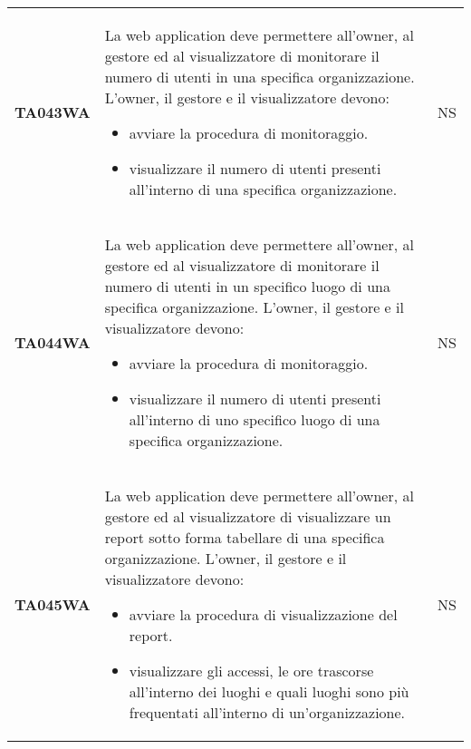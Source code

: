\documentclass[../piano-di-qualifica.tex]{subfiles}
\begin{document}
\begin{longtable}[H]{>{\centering\bfseries}m{3cm} >{}m{10cm} >{\centering\arraybackslash}m{3cm}}
  TA043WA           & La web application deve permettere all'owner, al gestore ed al visualizzatore di monitorare il numero di utenti in una specifica organizzazione. \newline
  L'owner, il gestore e il visualizzatore devono:
  \begin{itemize}
    \item avviare la procedura di monitoraggio.
    \item visualizzare il numero di utenti presenti all'interno di una specifica organizzazione.
  \end{itemize}
                    & NS                                                                                                                                                                                                                                                               \\
  TA044WA           & La web application deve permettere all'owner, al gestore ed al visualizzatore di monitorare il numero di utenti in un specifico luogo di una specifica organizzazione. \newline
  L'owner, il gestore e il visualizzatore devono:
  \begin{itemize}
    \item avviare la procedura di monitoraggio.
    \item visualizzare il numero di utenti presenti all'interno di uno specifico luogo di una specifica organizzazione.
  \end{itemize}
                    & NS                                                                                                                                                                                                                                                               \\
  TA045WA           & La web application deve permettere all'owner, al gestore ed al visualizzatore di visualizzare un report sotto forma tabellare di una specifica organizzazione. \newline
  L'owner, il gestore e il visualizzatore devono:
  \begin{itemize}
    \item avviare la procedura di visualizzazione del report.
    \item visualizzare gli accessi, le ore trascorse all'interno dei luoghi e quali luoghi sono più frequentati all'interno di un'organizzazione.
  \end{itemize}
                    & NS                                                                                                                                                                                                                                                               \\

\end{longtable}
\end{document}

